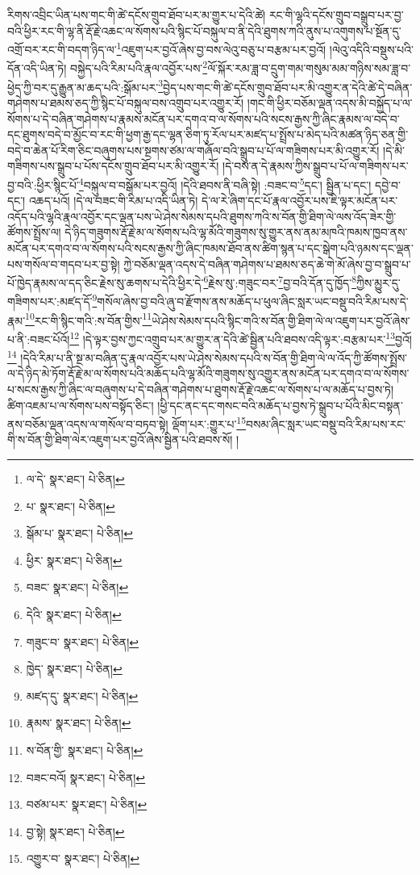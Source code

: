 རིགས་འབྲིང་ཡིན་པས་གང་གི་ཚེ་དངོས་གྲུབ་ཐོབ་པར་མ་གྱུར་པ་དེའི་ཚེ། རང་གི་ལྷའི་དངོས་གྲུབ་བསྒྲུབ་པར་བྱ་བའི་ཕྱིར་རང་གི་ལྷ་ནི་རྡོ་རྗེ་འཆང་ལ་སོགས་པའི་སྙིང་པོ་བསྐུལ་བ་ནི་དེའི་ཐུགས་ཀའི་ནུས་པ་འགུགས་པ་སྔོན་དུ་འགྲོ་བར་རང་གི་བདག་ཉིད་ལ་\footnote{ལ་དེ་  སྣར་ཐང་།  པེ་ཅིན། }འཇུག་པར་བྱའོ་ཞེས་བྱ་བས་ལེའུ་བཅུ་པ་བརྩམ་པར་བྱའོ། །ལེའུ་འདིའི་བསྡུས་པའི་དོན་འདི་ཡིན་ཏེ། བསྐྱེད་པའི་རིམ་པའི་རྣལ་འབྱོར་པས་\footnote{པ་  སྣར་ཐང་།  པེ་ཅིན། }ལོ་སྐོར་རམ་ཟླ་བ་དྲུག་གམ་གསུམ་མམ་གཉིས་སམ་ཟླ་བ་ཕྱེད་ཀྱི་བར་དུ་རྒྱུན་མ་ཆད་པའི་:སྒོམ་པར་\footnote{སྒོམ་པ་  སྣར་ཐང་།  པེ་ཅིན། }བྱེད་པས་གང་གི་ཚེ་དངོས་གྲུབ་ཐོབ་པར་མི་འགྱུར་ན་དེའི་ཚེ་དེ་བཞིན་གཤེགས་པ་ཐམས་ཅད་ཀྱི་སྙིང་པོ་བསྐུལ་བས་འགྲུབ་པར་འགྱུར་རོ། །གང་གི་ཕྱིར་བཅོམ་ལྡན་འདས་མི་བསྐྱོད་པ་ལ་སོགས་པ་དེ་བཞིན་གཤེགས་པ་རྣམས་མངོན་པར་དགའ་བ་ལ་སོགས་པའི་སངས་རྒྱས་ཀྱི་ཞིང་རྣམས་ལ་བདེ་བ་དང་ཐུགས་བདེ་བ་མྱོང་བ་རང་གི་ཕྱག་རྒྱ་དང་ལྷན་ཅིག་ཏུ་རོལ་པར་མཛད་པ་སྤྲོས་པ་མེད་པའི་མཚན་ཉིད་ཅན་གྱི་བདེ་བ་ཆེན་པོ་རིག་ཅིང་བཞུགས་པས་སྔགས་ཙམ་ལ་གཞོལ་བའི་སྒྲུབ་པ་པོ་ལ་གཟིགས་པར་མི་འགྱུར་རོ། །དེ་མི་གཟིགས་པས་སྒྲུབ་པ་པོས་དངོས་གྲུབ་ཐོབ་པར་མི་འགྱུར་རོ། །དེ་བས་ན་དེ་རྣམས་ཀྱིས་སྒྲུབ་པ་པོ་ལ་གཟིགས་པར་བྱ་བའི་:ཕྱིར་སྙིང་པོ་\footnote{ཕྱིར་  སྣར་ཐང་།  པེ་ཅིན། }བསྐུལ་བ་བསྒོམ་པར་བྱའོ། །དེའི་ཐབས་ནི་བཞི་སྟེ། :བཟང་བ་\footnote{བཟང་  སྣར་ཐང་།  པེ་ཅིན། }དང་། སྦྱིན་པ་དང་། དབྱེ་བ་དང་། འཆད་པའོ། །དེ་ལ་བཟང་གི་རིམ་པ་འདི་ཡིན་ཏེ། དེ་ལ་རེ་ཞིག་དང་པོ་རྣལ་འབྱོར་པས་ཇི་ལྟར་མངོན་པར་འདོད་པའི་ལྷའི་རྣལ་འབྱོར་དང་ལྡན་པས་ཡེ་ཤེས་སེམས་དཔའི་ཐུགས་ཀའི་ས་བོན་གྱི་ཐིག་ལེ་ལས་འོད་ཟེར་གྱི་ཚོགས་སྤྲོས་ལ། དེ་ཉིད་གཟུགས་རྡོ་རྗེ་མ་ལ་སོགས་པའི་ལྷ་མོའི་གཟུགས་སུ་གྱུར་ནས་ནམ་མཁའི་ཁམས་ཁྱབ་ནས་མངོན་པར་དགའ་བ་ལ་སོགས་པའི་སངས་རྒྱས་ཀྱི་ཞིང་ཁམས་ཐོབ་ནས་ཚིག་སྙན་པ་དང་སྒེག་པའི་ཉམས་དང་ལྡན་པས་གསོལ་བ་གདབ་པར་བྱ་སྟེ། ཀྱེ་བཅོམ་ལྡན་འདས་དེ་བཞིན་གཤེགས་པ་ཐམས་ཅད་ཆེ་གེ་མོ་ཞེས་བྱ་བ་སྒྲུབ་པ་པོ་ཁྱེད་རྣམས་ལ་དད་ཅིང་རྗེས་སུ་ཆགས་པ་དེའི་ཕྱིར་དེ་\footnote{དེའི་  སྣར་ཐང་།  པེ་ཅིན། }རྗེས་སུ་:གཟུང་བར་\footnote{གཟུང་བ་  སྣར་ཐང་།  པེ་ཅིན། }བྱ་བའི་དོན་དུ་ཁྱོད་\footnote{ཁྱེད་  སྣར་ཐང་།  པེ་ཅིན། }ཀྱིས་མྱུར་དུ་གཟིགས་པར་:མཛད་དོ་\footnote{མཛད་དུ་  སྣར་ཐང་།  པེ་ཅིན། }གསོལ་ཞེས་བྱ་བའི་ཞུ་བ་རྫོགས་ནས་མཆོད་པ་ཕུལ་ཞིང་སླར་ཡང་བསྡུ་བའི་རིམ་པས་དེ་རྣམ་\footnote{རྣམས་  སྣར་ཐང་།  པེ་ཅིན། }རང་གི་སྙིང་གའི་:ས་བོན་གྱིས་\footnote{ས་བོན་གྱི་  སྣར་ཐང་།  པེ་ཅིན། }ཡེ་ཤེས་སེམས་དཔའི་སྙིང་གའི་ས་བོན་གྱི་ཐིག་ལེ་ལ་འཇུག་པར་བྱའོ་ཞེས་པ་ནི་:བཟང་པོའོ།\footnote{བཟང་བའོ།  སྣར་ཐང་།  པེ་ཅིན། } །དེ་ལྟར་བྱས་ཀྱང་འགྲུབ་པར་མ་གྱུར་ན་དེའི་ཚེ་སྦྱིན་པའི་ཐབས་འདི་ལྟར་:བརྩམ་པར་\footnote{བཙམ་པར་  སྣར་ཐང་།  པེ་ཅིན། }བྱའོ།\footnote{བྱ་སྟེ།  སྣར་ཐང་།  པེ་ཅིན། } །དེའི་རིམ་པ་ནི་སྔ་མ་བཞིན་དུ་རྣལ་འབྱོར་པས་ཡེ་ཤེས་སེམས་དཔའི་ས་བོན་གྱི་ཐིག་ལེ་ལ་འོད་ཀྱི་ཚོགས་སྤྲོས་ལ་དེ་ཉིད་མེ་ཏོག་རྡོ་རྗེ་མ་ལ་སོགས་པའི་མཆོད་པའི་ལྷ་མོའི་གཟུགས་སུ་འགྱུར་ནས་མངོན་པར་དགའ་བ་ལ་སོགས་པ་སངས་རྒྱས་ཀྱི་ཞིང་ལ་བཞུགས་པ་དེ་བཞིན་གཤེགས་པ་ཐུགས་རྡོ་རྗེ་འཆང་ལ་སོགས་པ་ལ་མཆོད་པ་བྱས་ཏེ། ཚིག་འཇམ་པ་ལ་སོགས་པས་བསྟོད་ཅིང་། །ཕྱི་དང་ནང་དང་གསང་བའི་མཆོད་པ་བྱས་ཏེ་སྒྲུབ་པ་པོའི་མིང་བསྟན་ནས་བཅོམ་ལྡན་འདས་ལ་གསོལ་བ་བཏབ་སྟེ། ལྡོག་པར་:གྱུར་པ་\footnote{འགྱུར་བ་  སྣར་ཐང་།  པེ་ཅིན། }བསམ་ཞིང་སླར་ཡང་བསྡུ་བའི་རིམ་པས་རང་གི་ས་བོན་གྱི་ཐིག་ལེར་འཇུག་པར་བྱའོ་ཞེས་སྦྱིན་པའི་ཐབས་སོ། །
